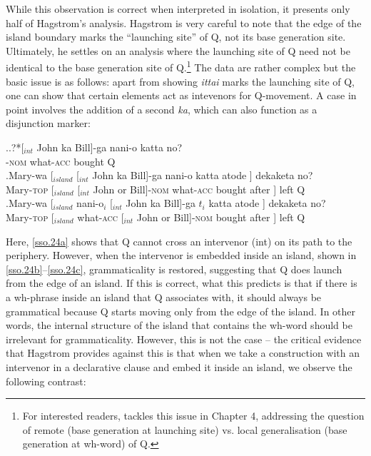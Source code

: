 \documentclass{glossa}
\begin{document}
While this observation is correct when interpreted in isolation, it presents only half of Hagstrom's analysis. Hagstrom is very careful to note that the edge of the island boundary marks the ``launching site'' of Q, not its base generation site. Ultimately, he settles on an analysis where the launching site of Q need not be identical to the base generation site of Q.\footnote{For interested readers, \cite{hagstrom:1998} tackles this issue in Chapter 4, addressing the question of remote (base generation at launching site) vs. local generalisation (base generation at wh-word) of Q.} The data are rather complex but the basic issue is as follows: apart from showing \textit{ittai} marks the launching site of Q, one can show that certain elements act as intevenors for Q-movement. A case in point involves the addition of a second \textit{ka}, which can also function as a disjunction marker:

\ex.\ag.?*\label{sso.24a}[$_{int}$ John ka Bill]-ga nani-o katta no?\\
      [$_{int}$ John or Bill]-\textsc{nom} what-\textsc{acc} bought Q\\
   \bg.\label{sso.24b}Mary-wa [$_{island}$ [$_{int}$ John ka Bill]-ga nani-o katta atode ] dekaketa no?\\
      Mary-\textsc{top} [$_{island}$ [$_{int}$ John or Bill]-\textsc{nom} what-\textsc{acc} bought after ] left Q\\
   \bg.\label{sso.24c}Mary-wa [$_{island}$ nani-o$_i$ [$_{int}$ John ka Bill]-ga $t_i$ katta atode ] dekaketa no?\\
      Mary-\textsc{top} [$_{island}$ what-\textsc{acc} [$_{int}$ John or Bill]-\textsc{nom} {} bought after ] left Q\\

Here, \ref{sso.24a} shows that Q cannot cross an intervenor (int) on its path to the periphery. However, when the intervenor is embedded inside an island, shown in \ref{sso.24b}--\ref{sso.24c}, grammaticality is restored, suggesting that Q does launch from the edge of an island. If this is correct, what this predicts is that if there is a wh-phrase inside an island that Q associates with, it should always be grammatical because Q starts moving only from the edge of the island. In other words, the internal structure of the island that contains the wh-word should be irrelevant for grammaticality. However, this is not the case -- the critical evidence that Hagstrom provides against this is that when we take a construction with an intervenor in a declarative clause and embed it inside an island, we observe the following contrast:
\end{document}
